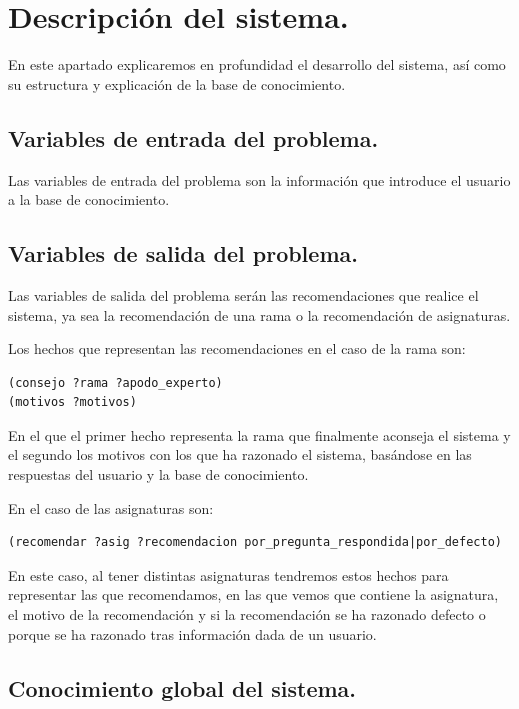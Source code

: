 \documentclass[12pt, spanish]{article}
\begin{document}
\newpage

\section{Descripción del sistema.}

En este apartado explicaremos en profundidad el desarrollo del sistema, así como su estructura y explicación de la base de conocimiento.

\subsection{Variables de entrada del problema.}

Las variables de entrada del problema son la información que introduce el usuario a la base de conocimiento.

\subsection{Variables de salida del problema.}

Las variables de salida del problema serán las recomendaciones que realice el sistema, ya sea la recomendación de una rama o la recomendación de asignaturas.

Los hechos que representan las recomendaciones en el caso de la rama son:

\begin{lstlisting}
(consejo ?rama ?apodo_experto)
(motivos ?motivos)
\end{lstlisting}

En el que el primer hecho representa la rama que finalmente aconseja el sistema y el segundo los motivos con los que ha razonado el sistema, basándose en las respuestas del usuario y la base de conocimiento.


En el caso de las asignaturas son:

\begin{lstlisting}
(recomendar ?asig ?recomendacion por_pregunta_respondida|por_defecto)
\end{lstlisting}

En este caso, al tener distintas asignaturas tendremos estos hechos para representar las que recomendamos, en las que vemos que contiene la asignatura, el motivo de la recomendación y si la recomendación se ha razonado defecto o porque se ha razonado tras información dada de un usuario.

\subsection{Conocimiento global del sistema.}
\end{document}
